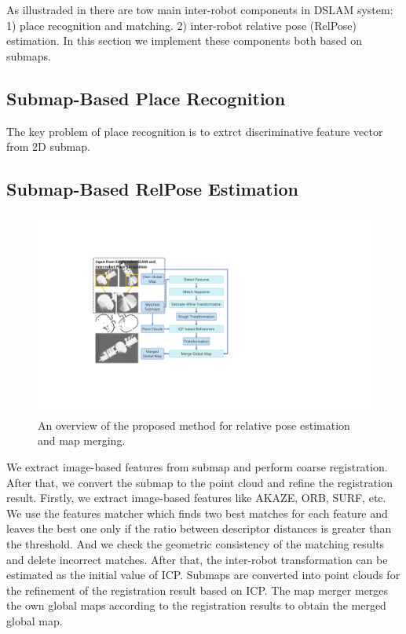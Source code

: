 \label{sec:dslam}
As illustraded in  there are tow main inter-robot components in DSLAM system: 1) place recognition and matching. 2) inter-robot relative pose (RelPose) estimation. In this section we implement these components both based on submaps.

\subsection{Submap-Based Place Recognition}
The key problem of place recognition is to extrct discriminative feature vector from 2D submap.

\subsection{Submap-Based RelPose Estimation}

\begin{figure}[t]
    \includegraphics[width=0.99\linewidth]{fig/registration.pdf}
    \caption{An overview of the proposed method for relative pose estimation and map merging.}
    \label{fig:registration}
\end{figure}

We extract image-based features from submap and perform coarse registration. 
After that, we convert the submap to the point cloud and refine the registration result.
Firstly, we extract image-based features like AKAZE, ORB, SURF, etc.
We use the features matcher which finds two best matches for each feature and leaves the best one only if the ratio between descriptor distances is greater than the threshold.
And we check the geometric consistency of the matching results and delete incorrect matches.
After that, the inter-robot transformation can be estimated as the initial value of ICP.
Submaps are converted into point clouds for the refinement of the registration result based on ICP.
The map merger merges the own global maps according to the registration results to obtain the merged global map.
